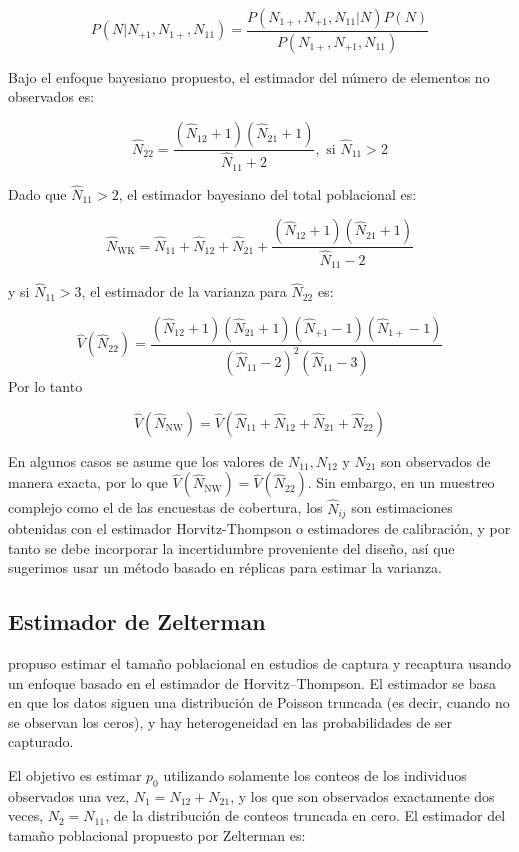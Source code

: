 \documentclass[
  12pt,
]{book}
\begin{document}
\[P(N|N_{+1}, N_{1+}, N_{11}) = \frac{P(N_{1+}, N_{+1}, N_{11}|N)P(N)}{P(N_{1+}, N_{+1}, N_{11})}\]

Bajo el enfoque bayesiano propuesto, el estimador del número de elementos no observados es:

\[\hat{N}_{22} = \frac{(\hat{N}_{12}+1)(\hat{N}_{21}+1)}{\hat{N}_{11} + 2}, \text{  si } \hat{N}_{11} > 2\]

Dado que \(\hat{N}_{11} > 2\), el estimador bayesiano del total poblacional es:

\[
\hat{N}_{\text{WK}} = \hat{N}_{11} + \hat{N}_{12} + \hat{N}_{21} + \frac{(\hat{N}_{12} + 1)(\hat{N}_{21} + 1)}{\hat{N}_{11} - 2}\]

y si \(\hat{N}_{11} > 3\), el estimador de la varianza para \(\hat{N}_{\text{22}}\) es:

\[\hat{V}(\hat{N}_{\text{22}}) = \frac{(\hat{N}_{12} + 1)(\hat{N}_{21} + 1)(\hat{N}_{+1} - 1)(\hat{N}_{1+} - 1)}{(\hat{N}_{11} - 2)^2(\hat{N}_{11} - 3)}\]
Por lo tanto

\[\hat{V}(\hat{N}_{\text{NW}}) = \hat{V}(\hat{N}_{11} + \hat{N}_{12} + \hat{N}_{21} + \hat{N}_{22})\]

En algunos casos se asume que los valores de \(N_{11}, N_{12}\) y \(N_{21}\) son observados de manera exacta, por lo que \(\hat{V}(\hat{N}_{\text{NW}}) = \hat{V}(\hat{N}_{22})\). Sin embargo, en un muestreo complejo como el de las encuestas de cobertura, los \(\hat{N}_{ij}\) son estimaciones obtenidas con el estimador Horvitz-Thompson o estimadores de calibración, y por tanto se debe incorporar la incertidumbre proveniente del diseño, así que sugerimos usar un método basado en réplicas para estimar la varianza.

\subsection{Estimador de Zelterman}\label{estimador-de-zelterman}

\citet{zelterman1988robust} propuso estimar el tamaño poblacional en estudios de captura y recaptura usando un enfoque basado en el estimador de Horvitz--Thompson. El estimador se basa en que los datos siguen una distribución de Poisson truncada (es decir, cuando no se observan los ceros), y hay heterogeneidad en las probabilidades de ser capturado.

El objetivo es estimar \(p_0\) utilizando solamente los conteos de los individuos observados una vez, \(N_{1}=N_{12}+N_{21}\), y los que son observados exactamente dos veces, \(N_{2}=N_{11}\), de la distribución de conteos truncada en cero. El estimador del tamaño poblacional propuesto por Zelterman es:
\end{document}
